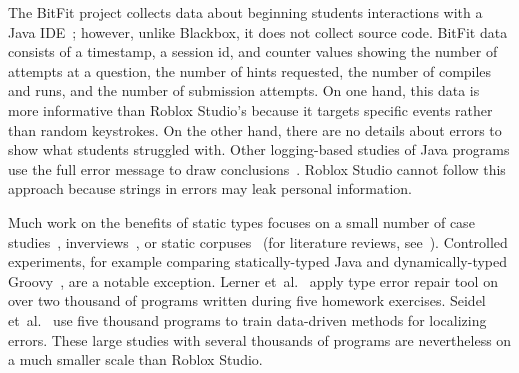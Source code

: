 \documentclass[english,submission,cleveref]{programming}
\begin{document}
The BitFit project collects data about beginning students interactions with a
Java IDE~\cite{ekc-wccce-2016,anna-russo-kennedy-ms-2006}; however, unlike Blackbox, it does
not collect source code.
BitFit data consists of a timestamp, a session id, and counter values showing
the number of attempts at a question, the number of hints requested, the number
of compiles and runs, and the number of submission attempts.
On one hand, this data is more informative than Roblox Studio's because it
targets specific events rather than random keystrokes.
On the other hand, there are no details about errors to show what students
struggled with.
Other logging-based studies of Java programs use the full error message to
draw conclusions~\cite{bgimgm-cse-2016,dlc-iticse-2014}.
Roblox Studio cannot follow this approach because strings in errors may leak
personal information.

Much work on the benefits of static types focuses on a small number
of case studies~\cite{w-popl-1986,hw-scp-2004,td-tosem-2001},
inverviews~\cite{cdhhjklwya-hatra-2020,gstf-hatra-2021,cams-oopsla-2020},
or static corpuses~\cite{rppd-fse-2014,bhmvv-toplas-2019,bmvv-arxiv-2019}
(for literature reviews, see~\cite{empirical-types,heeren-thesis}).
Controlled experiments, for example comparing statically-typed Java and dynamically-typed
Groovy~\cite{khrts-icpc-2012}, are a notable exception.
Lerner et~al.~\cite{lfgc-pldi-2007} apply type error repair tool on over two thousand
of programs written during five homework exercises.
Seidel et~al.~\cite{sscwj-oopsla-2017,sjw-jfp-2018} use five thousand programs
to train data-driven methods for localizing errors.
These large studies with several thousands of programs are
nevertheless on a much smaller scale than Roblox Studio.


%
%
%
%
%
%

\end{document}
